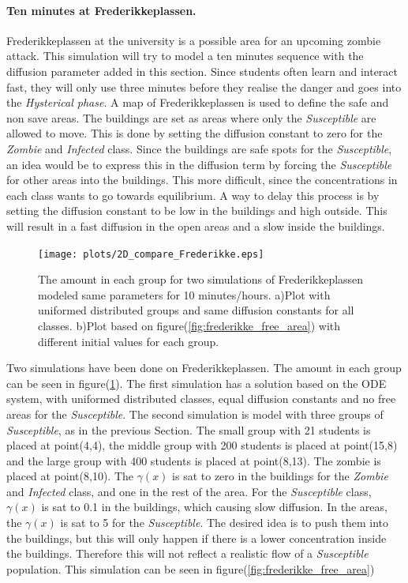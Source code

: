 \documentclass[%
twoside,                 %
final,                   %
10pt]{article}
\begin{document}
\paragraph{Ten minutes at Frederikkeplassen.}
Frederikkeplassen at the university is a possible area for an upcoming zombie attack. This simulation will try to model a ten minutes sequence with the diffusion parameter added in this section. Since students often learn and interact fast, they will only use three minutes before they realise the danger and goes into the \emph{Hysterical phase}. A map of Frederikkeplassen is used to define the safe and non save areas. The buildings are set as areas where only the \emph{Susceptible} are allowed to move. This is done by setting the diffusion constant to zero for the \emph{Zombie} and \emph{Infected} class. Since the buildings are safe spots for the \emph{Susceptible}, an idea would be to express this in the diffusion term by forcing the \emph{Susceptible} for other areas into the buildings. This more difficult, since the concentrations in each class wants to go towards equilibrium. A way to delay this process is by setting the diffusion constant to be low in the buildings and high outside. This will result in a fast diffusion in the open areas and a slow inside the buildings. 


\begin{figure}[ht]
  \centerline{\texttt{[image: plots/2D\_compare\_Frederikke.eps]}}
  \caption{
  \label{fig:frederikke_numbers} The amount in each group for two simulations of Frederikkeplassen modeled same parameters for 10 minutes/hours. a)Plot with uniformed distributed groups and same diffusion constants for all classes. b)Plot based on figure(\ref{fig:frederikke_free_area}) with different initial values for each group.
  }
\end{figure}


Two simulations have been done on Frederikkeplassen. The amount in each group can be seen in figure(\ref{fig:frederikke_numbers}). The first simulation has a solution based on the ODE system, with uniformed distributed classes, equal diffusion constants and no free areas for the \emph{Susceptible}. The second simulation is model with three groups of \emph{Susceptible}, as in the previous Section. The small group with 21 students is placed at point(4,4), the middle group with 200 students is placed at point(15,8) and the large group with 400 students is placed at point(8,13). The zombie is placed at point(8,10). The $\gamma(x)$ is sat to zero in the buildings for the \emph{Zombie} and \emph{Infected} class, and one in the rest of the area. For the \emph{Susceptible} class, $\gamma(x)$ is sat to 0.1 in the buildings, which causing slow diffusion. In the areas, the $\gamma(x)$ is sat to 5 for the \emph{Susceptible}. The desired idea is to push them into  the buildings, but this will only happen if there is a lower concentration inside the buildings. Therefore this will not reflect a realistic flow of a \emph{Susceptible} population. This simulation can be seen in figure(\ref{fig:frederikke_free_area})  
\end{document}
